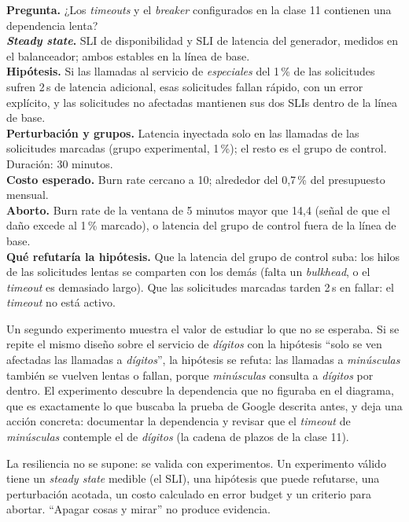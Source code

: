 \documentclass[variant=apuntes,cover=institutional,mode=screen]{ua-engineering-v6-article}
\begin{document}
\begin{uainfo}
\textbf{Pregunta.} ¿Los \emph{timeouts} y el \emph{breaker} configurados en la clase 11 contienen una dependencia lenta?\\[2pt]
\textbf{\emph{Steady state}.} SLI de disponibilidad y SLI de latencia del generador, medidos en el balanceador; ambos estables en la línea de base.\\[2pt]
\textbf{Hipótesis.} Si las llamadas al servicio de \emph{especiales} del 1\,\% de las solicitudes sufren 2\,s de latencia adicional, esas solicitudes fallan rápido, con un error explícito, y las solicitudes no afectadas mantienen sus dos SLIs dentro de la línea de base.\\[2pt]
\textbf{Perturbación y grupos.} Latencia inyectada solo en las llamadas de las solicitudes marcadas (grupo experimental, 1\,\%); el resto es el grupo de control. Duración: 30 minutos.\\[2pt]
\textbf{Costo esperado.} Burn rate cercano a 10; alrededor del 0,7\,\% del presupuesto mensual.\\[2pt]
\textbf{Aborto.} Burn rate de la ventana de 5 minutos mayor que 14,4 (señal de que el daño excede al 1\,\% marcado), o latencia del grupo de control fuera de la línea de base.\\[2pt]
\textbf{Qué refutaría la hipótesis.} Que la latencia del grupo de control suba: los hilos de las solicitudes lentas se comparten con los demás (falta un \emph{bulkhead}, o el \emph{timeout} es demasiado largo). Que las solicitudes marcadas tarden 2\,s en fallar: el \emph{timeout} no está activo.
\end{uainfo}

Un segundo experimento muestra el valor de estudiar lo que no se esperaba. Si se repite el mismo diseño sobre el servicio de \emph{dígitos} con la hipótesis ``solo se ven afectadas las llamadas a \emph{dígitos}'', la hipótesis se refuta: las llamadas a \emph{minúsculas} también se vuelven lentas o fallan, porque \emph{minúsculas} consulta a \emph{dígitos} por dentro. El experimento descubre la dependencia que no figuraba en el diagrama, que es exactamente lo que buscaba la prueba de Google descrita antes, y deja una acción concreta: documentar la dependencia y revisar que el \emph{timeout} de \emph{minúsculas} contemple el de \emph{dígitos} (la cadena de plazos de la clase 11).

\begin{uakeybox}
La resiliencia no se supone: se valida con experimentos. Un experimento válido tiene un \emph{steady state} medible (el SLI), una hipótesis que puede refutarse, una perturbación acotada, un costo calculado en error budget y un criterio para abortar. ``Apagar cosas y mirar'' no produce evidencia.
\end{uakeybox}
\end{document}
